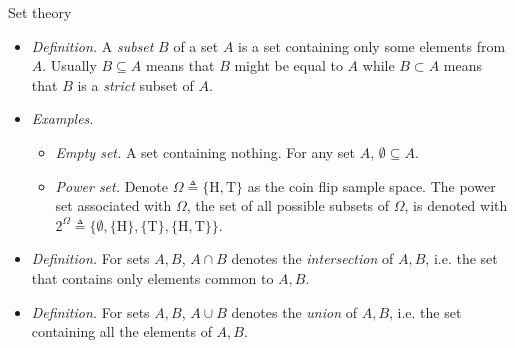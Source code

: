 \documentclass{beamer}
\begin{document}
\begin{frame}{Set theory}
    \begin{itemize}
        \item
        \textit{Definition.} A \textit{subset} $ B $ of a set $ A $ is a set
        containing only some elements from $ A $. Usually $ B \subseteq A $
        means that $ B $ might be equal to $ A $ while $ B \subset A $ means
        that $ B $ is a \textit{strict} subset of $ A $.

        \item
        \textit{Examples.}
        \begin{itemize}
            \item
            \textit{Empty set.} A set containing nothing. For any set $ A $,
            $ \emptyset \subseteq A $.

            \item
            \textit{Power set.} Denote $ \Omega \triangleq \{\text{H},
            \text{T}\} $ as the coin flip sample space. The power set
            associated with $ \Omega $, the set of all possible subsets of
            $ \Omega $, is denoted with $ 2^\Omega \triangleq \{\emptyset,
            \{\text{H}\}, \{\text{T}\}, \{\text{H}, \text{T}\}\} $.
        \end{itemize}

        \item
        \textit{Definition.} For sets $ A, B $, $ A \cap B $ denotes the 
        \textit{intersection} of $ A, B $, i.e. the set that contains only
        elements common to $ A, B $.

        \item
        \textit{Definition.} For sets $ A, B $, $ A \cup B $ denotes the
        \textit{union} of $ A, B $, i.e. the set containing all the elements
        of $ A, B $.
    \end{itemize}
\end{frame}
\end{document}
